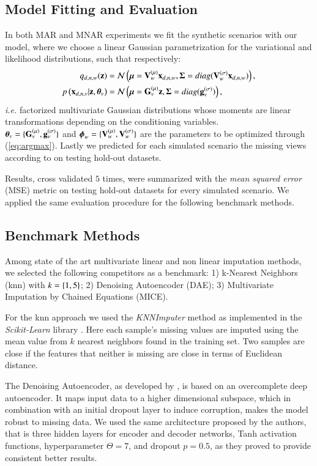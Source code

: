 \subsection{Model Fitting and Evaluation}

In both MAR and MNAR experiments we fit the synthetic scenarios with our model, where we choose a linear Gaussian parametrization for the variational and likelihood distributions, such that respectively:
\begin{align}
\label{eq:encoder}
q_{d,n,w}(\mathbf{z}) &= \mathcal{N}\left(\boldsymbol{\mu}=\mathbf{V}_w^{(\mu)} \mathbf{x}_{d,n,w}, \boldsymbol{\Sigma} = diag(\mathbf{V}_w^{(\sigma)} \mathbf{x}_{d,n,w})\right), \\
\label{eq:decoder}
p\left(\mathbf{x}_{d,n,v}|\mathbf{z},\boldsymbol{\theta}_v\right) &= \mathcal{N}\left(\boldsymbol{\mu} = \mathbf{G}_v^{(\mu)} \mathbf{z}, \boldsymbol{\Sigma} = diag(\mathbf{g}_v^{(\sigma)})\right),
\end{align}
\textit{i.e.} factorized multivariate Gaussian distributions whose moments are linear transformations depending on the conditioning variables. \\
$\boldsymbol{\theta}_v = \{\mathbf{G}_v^{(\mu)}, \mathbf{g}_v^{(\sigma)}\}$ and $\boldsymbol{\phi}_w=\{\mathbf{V}_w^{(\mu)}, \mathbf{V}_w^{(\sigma)}\}$ are the parameters to be optimized through (\ref{eq:argmax}).
Lastly we predicted for each simulated scenario the missing views according to  on testing hold-out datasets.

Results, cross validated $5$ times, were summarized with the \textit{mean squared error} (MSE) metric on testing hold-out datasets for every simulated scenario.
We applied the same evaluation procedure for the following benchmark methods.

\subsection{Benchmark Methods}
Among state of the art multivariate linear and non linear imputation methods, we selected the following competitors as a benchmark:
1) k-Nearest Neighbors (knn) with $k=\left\{1, 5\right\}$;
2) Denoising Autoencoder (DAE);
3) Multivariate Imputation by Chained Equations (MICE).

For the knn approach we used the \textit{KNNImputer} method as implemented in the \textit{Scikit-Learn} library \citep{sklearn}.
Here each sample's missing values are imputed using the mean value from $k$ nearest neighbors found in the training set.
Two samples are close if the features that neither is missing are close in terms of Euclidean distance.

The Denoising Autoencoder, as developed by \cite{dae}, is based on an overcomplete deep autoencoder.
It maps input data to a higher dimensional subspace, which in combination with an initial dropout layer to induce corruption, makes the model robust to missing data.
We used the same architecture proposed by the authors, that is three hidden layers for encoder and decoder networks, Tanh activation functions, hyperparameter $\Theta=7$, and dropout $p=0.5$, as they proved to provide consistent better results.

